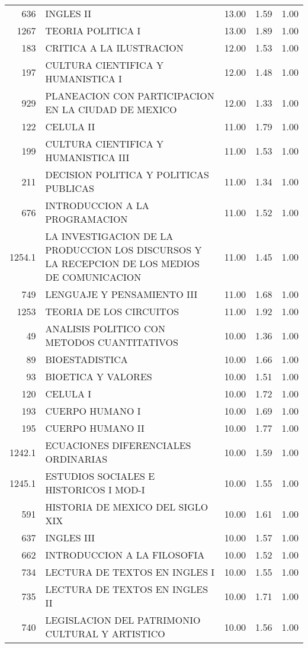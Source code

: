 \documentclass[12pt]{article}
\begin{document}
\begin{table}[ht]
\begin{tabular}{rlrrr}
  636 & INGLES II & 13.00 & 1.59 & 1.00 \\ 
  1267 & TEORIA POLITICA I & 13.00 & 1.89 & 1.00 \\ 
  183 & CRITICA A LA ILUSTRACION & 12.00 & 1.53 & 1.00 \\ 
  197 & CULTURA CIENTIFICA Y HUMANISTICA I & 12.00 & 1.48 & 1.00 \\ 
  929 & PLANEACION CON PARTICIPACION EN LA CIUDAD DE MEXICO & 12.00 & 1.33 & 1.00 \\ 
  122 & CELULA II & 11.00 & 1.79 & 1.00 \\ 
  199 & CULTURA CIENTIFICA Y HUMANISTICA III & 11.00 & 1.53 & 1.00 \\ 
  211 & DECISION POLITICA Y POLITICAS PUBLICAS & 11.00 & 1.34 & 1.00 \\ 
  676 & INTRODUCCION A LA PROGRAMACION & 11.00 & 1.52 & 1.00 \\ 
  1254.1 & LA INVESTIGACION DE LA PRODUCCION LOS DISCURSOS Y LA RECEPCION DE LOS MEDIOS DE COMUNICACION & 11.00 & 1.45 & 1.00 \\ 
  749 & LENGUAJE Y PENSAMIENTO III & 11.00 & 1.68 & 1.00 \\ 
  1253 & TEORIA DE LOS CIRCUITOS & 11.00 & 1.92 & 1.00 \\ 
  49 & ANALISIS POLITICO CON METODOS CUANTITATIVOS & 10.00 & 1.36 & 1.00 \\ 
  89 & BIOESTADISTICA & 10.00 & 1.66 & 1.00 \\ 
  93 & BIOETICA Y VALORES & 10.00 & 1.51 & 1.00 \\ 
  120 & CELULA I & 10.00 & 1.72 & 1.00 \\ 
  193 & CUERPO HUMANO I & 10.00 & 1.69 & 1.00 \\ 
  195 & CUERPO HUMANO II & 10.00 & 1.77 & 1.00 \\ 
  1242.1 & ECUACIONES DIFERENCIALES ORDINARIAS & 10.00 & 1.59 & 1.00 \\ 
  1245.1 & ESTUDIOS SOCIALES E HISTORICOS I MOD-I & 10.00 & 1.55 & 1.00 \\ 
  591 & HISTORIA DE MEXICO DEL SIGLO XIX & 10.00 & 1.61 & 1.00 \\ 
  637 & INGLES III & 10.00 & 1.57 & 1.00 \\ 
  662 & INTRODUCCION A LA FILOSOFIA & 10.00 & 1.52 & 1.00 \\ 
  734 & LECTURA DE TEXTOS EN INGLES I & 10.00 & 1.55 & 1.00 \\ 
  735 & LECTURA DE TEXTOS EN INGLES II & 10.00 & 1.71 & 1.00 \\ 
  740 & LEGISLACION DEL PATRIMONIO CULTURAL Y ARTISTICO & 10.00 & 1.56 & 1.00 \\ 
  \end{tabular}
\end{table}
\end{document}
